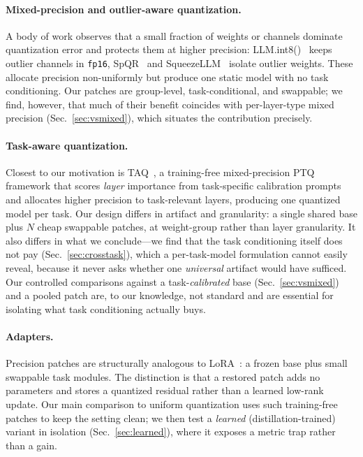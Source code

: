 \documentclass[11pt]{article}
\newcommand{\code}[1]{\texttt{#1}}
\begin{document}
\paragraph{Mixed-precision and outlier-aware quantization.} A body of work
observes that a small fraction of weights or channels dominate quantization
error and protects them at higher precision: LLM.int8()~\cite{dettmers2022int8}
keeps outlier channels in \code{fp16}, SpQR~\cite{dettmers2023spqr} and
SqueezeLLM~\cite{kim2023squeezellm} isolate outlier weights. These allocate
precision non-uniformly but produce one static model with no task
conditioning. Our patches are group-level, task-conditional, and swappable; we
find, however, that much of their benefit coincides with per-layer-type mixed
precision (Sec.~\ref{sec:vsmixed}), which situates the contribution precisely.

\paragraph{Task-aware quantization.} Closest to our motivation is
TAQ~\cite{levi2025taq}, a training-free mixed-precision PTQ framework that
scores \emph{layer} importance from task-specific calibration prompts and
allocates higher precision to task-relevant layers, producing one quantized
model per task. Our design differs in artifact and granularity: a single shared
base plus $N$ cheap swappable patches, at weight-group rather than layer
granularity. It also differs in what we conclude---we find that the task
conditioning itself does not pay (Sec.~\ref{sec:crosstask}), which a
per-task-model formulation cannot easily reveal, because it never asks whether
one \emph{universal} artifact would have sufficed. Our controlled comparisons
against a task-\emph{calibrated} base (Sec.~\ref{sec:vsmixed}) and a pooled
patch are, to our knowledge, not standard and are essential for isolating what
task conditioning actually buys.

\paragraph{Adapters.} Precision patches are structurally analogous to
LoRA~\cite{hu2021lora}: a frozen base plus small swappable task modules. The
distinction is that a restored patch adds no parameters and stores a quantized
residual rather than a learned low-rank update. Our main comparison to uniform
quantization uses such training-free patches to keep the setting clean; we then
test a \emph{learned} (distillation-trained) variant in isolation
(Sec.~\ref{sec:learned}), where it exposes a metric trap rather than a gain.
\end{document}
